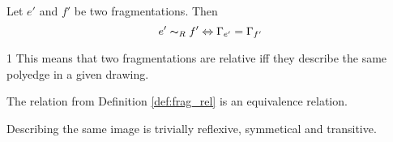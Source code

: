 \begin{definition}\label{def:frag_rel}
	Let $e'$ and $f'$ be two fragmentations. Then $$e' \thicksim_R f' \Leftrightarrow \Gamma_{e'} = \Gamma_{f'}$$
\end{definition}1
This means that two fragmentations are relative iff they describe the same polyedge in a given drawing. 
\begin{lemma}
	The relation from Definition \ref{def:frag_rel} is an equivalence relation.
\end{lemma}
\begin{sketch}
	Describing the same image is trivially reflexive, symmetical and transitive.
\end{sketch}
